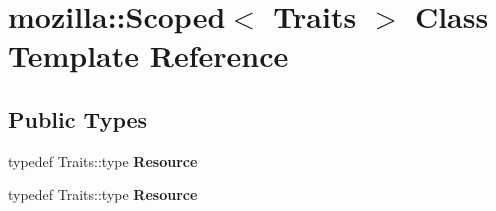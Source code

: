 \hypertarget{classmozilla_1_1_scoped}{\section{mozilla\-:\-:Scoped$<$ Traits $>$ Class Template Reference}
\label{classmozilla_1_1_scoped}
}
\subsection*{Public Types}
\begin{DoxyCompactItemize}
\item 
\hypertarget{classmozilla_1_1_scoped_ab39a700e2e5505202dd01603c33d1b5f}{typedef Traits\-::type {\bfseries Resource}}\label{classmozilla_1_1_scoped_ab39a700e2e5505202dd01603c33d1b5f}

\item 
\hypertarget{classmozilla_1_1_scoped_ab39a700e2e5505202dd01603c33d1b5f}{typedef Traits\-::type {\bfseries Resource}}\label{classmozilla_1_1_scoped_ab39a700e2e5505202dd01603c33d1b5f}

\end{DoxyCompactItemize}

